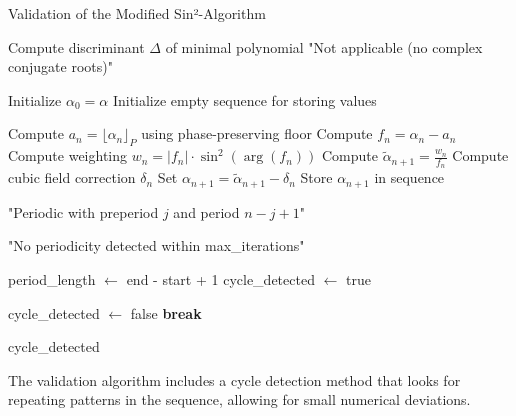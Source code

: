 \begin{algorithm}
\caption{Validation of the Modified Sin²-Algorithm}
\label{alg:subtractive_validation}
\begin{algorithmic}[1]
    \State Compute discriminant $\Delta$ of minimal polynomial
        \State \Return "Not applicable (no complex conjugate roots)"
    \EndIf
    
    \State Initialize $\alpha_0 = \alpha$
    \State Initialize empty sequence for storing values
    
        \State Compute $a_n = \lfloor \alpha_n \rfloor_P$ using phase-preserving floor
        \State Compute $f_n = \alpha_n - a_n$
        \State Compute weighting $w_n = |f_n| \cdot \sin^2(\arg(f_n))$
        \State Compute $\tilde{\alpha}_{n+1} = \frac{w_n}{f_n}$
        \State Compute cubic field correction $\delta_n$
        \State Set $\alpha_{n+1} = \tilde{\alpha}_{n+1} - \delta_n$
        \State Store $\alpha_{n+1}$ in sequence
        
                \State \Return "Periodic with preperiod $j$ and period $n-j+1$"
            \EndIf
        \EndFor
    \EndFor
    
    \State \Return "No periodicity detected within max\_iterations"
\EndProcedure

    \State period\_length $\gets$ end - start + 1
    \State cycle\_detected $\gets$ true
    
            \State cycle\_detected $\gets$ false
            \State \textbf{break}
        \EndIf
    \EndFor
    
    \State \Return cycle\_detected
\EndFunction
\end{algorithmic}
\end{algorithm}

\begin{remark}
The validation algorithm includes a cycle detection method that looks for repeating patterns in the sequence, allowing for small numerical deviations.
\end{remark}


